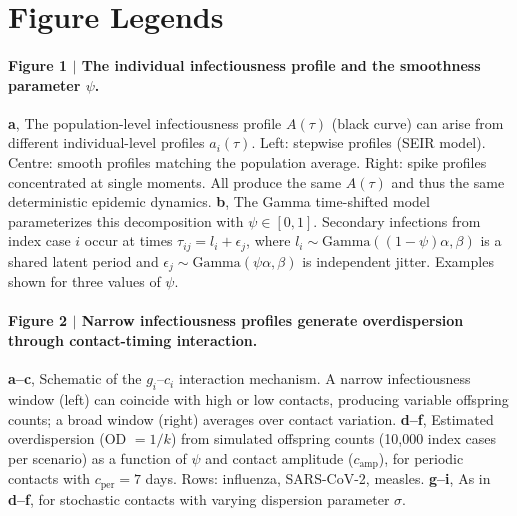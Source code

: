 \documentclass[10pt]{article}
\begin{document}





\clearpage
\section{Figure Legends}

\paragraph{Figure 1 $|$ The individual infectiousness profile and the smoothness parameter $\psi$.}
\textbf{a}, The population-level infectiousness profile $A(\tau)$ (black curve) can arise from different individual-level profiles $a_i(\tau)$. Left: stepwise profiles (SEIR model). Centre: smooth profiles matching the population average. Right: spike profiles concentrated at single moments. All produce the same $A(\tau)$ and thus the same deterministic epidemic dynamics.
\textbf{b}, The Gamma time-shifted model parameterizes this decomposition with $\psi \in [0,1]$. Secondary infections from index case $i$ occur at times $\tau_{ij} = l_i + \epsilon_j$, where $l_i \sim \text{Gamma}((1-\psi)\alpha, \beta)$ is a shared latent period and $\epsilon_j \sim \text{Gamma}(\psi\alpha, \beta)$ is independent jitter. Examples shown for three values of $\psi$.

\paragraph{Figure 2 $|$ Narrow infectiousness profiles generate overdispersion through contact-timing interaction.}
\textbf{a--c}, Schematic of the $g_i$--$c_i$ interaction mechanism. A narrow infectiousness window (left) can coincide with high or low contacts, producing variable offspring counts; a broad window (right) averages over contact variation.
\textbf{d--f}, Estimated overdispersion (OD $= 1/k$) from simulated offspring counts (10,000 index cases per scenario) as a function of $\psi$ and contact amplitude ($c_\text{amp}$), for periodic contacts with $c_\text{per} = 7$ days. Rows: influenza, SARS-CoV-2, measles.
\textbf{g--i}, As in \textbf{d--f}, for stochastic contacts with varying dispersion parameter $\sigma$.
\end{document}
